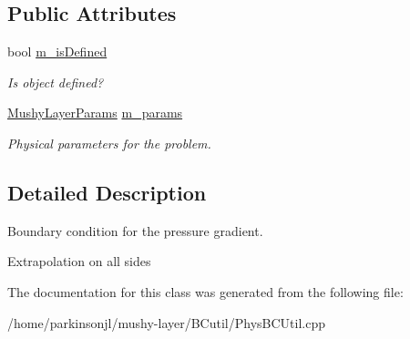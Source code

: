 \subsection*{Public Attributes}
\begin{DoxyCompactItemize}
\item 
\mbox{\label{class_basic_grad_pressure_b_c_function_ab06c724ad26290b8b8fd7fb332890d0f}} 
bool \hyperlink{class_basic_grad_pressure_b_c_function_ab06c724ad26290b8b8fd7fb332890d0f}{m\+\_\+is\+Defined}
\begin{DoxyCompactList}\small\item\em Is object defined? \end{DoxyCompactList}\item 
\mbox{\label{class_basic_grad_pressure_b_c_function_a803f06865c3dcb81d220f4410b569113}} 
\hyperlink{class_mushy_layer_params}{Mushy\+Layer\+Params} \hyperlink{class_basic_grad_pressure_b_c_function_a803f06865c3dcb81d220f4410b569113}{m\+\_\+params}
\begin{DoxyCompactList}\small\item\em Physical parameters for the problem. \end{DoxyCompactList}\end{DoxyCompactItemize}


\subsection{Detailed Description}
Boundary condition for the pressure gradient. 

Extrapolation on all sides 

The documentation for this class was generated from the following file\+:\begin{DoxyCompactItemize}
\item 
/home/parkinsonjl/mushy-\/layer/\+B\+Cutil/Phys\+B\+C\+Util.\+cpp\end{DoxyCompactItemize}
